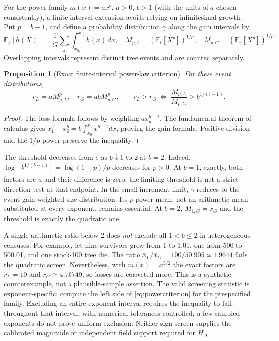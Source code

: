 \documentclass[11pt,a4paper]{article}
\newcommand{\E}{\mathbb{E}}
\newtheorem{proposition}{Proposition}[section]
\theoremstyle{remark}
\begin{document}
For the power family $m(x)=a x^b$, $a>0$, $b>1$ (with the units of $a$ chosen consistently), a finite-interval extension avoids relying on infinitesimal growth. Put $p=b-1$, and define a probability distribution $\gamma$ along the gain intervals by
\begin{equation}
 \E_\gamma[h(X)]=\frac{1}{G}\sum_j\int_{x_{0j}}^{x_{1j}}h(x)\,dx,
 \quad M_{p,L}=(\E_\ell[X^p])^{1/p},\quad M_{p,G}=(\E_\gamma[X^p])^{1/p}.
 \label{eq:powermoments}
\end{equation}
Overlapping intervals represent distinct tree events and are counted separately.
\begin{proposition}[Exact finite-interval power-law criterion]\label{prop:power}
For these event distributions,
\begin{equation}
 r_L=aM_{p,L}^{p},\quad r_G=abM_{p,G}^{p},\qquad
 r_L>r_G\ \Longleftrightarrow\ \frac{M_{p,L}}{M_{p,G}}>b^{1/(b-1)}.
 \label{eq:powercriterion}
\end{equation}
\end{proposition}
\begin{proof}
The loss formula follows by weighting $a x_d^{b-1}$. The fundamental theorem of calculus gives $x_1^b-x_0^b=b\int_{x_0}^{x_1}x^{b-1}dx$, proving the gain formula. Positive division and the $1/p$ power preserve the inequality.
\end{proof}

The threshold decreases from $e$ as $b\downarrow1$ to 2 at $b=2$. Indeed, $\log[b^{1/(b-1)}]=\log(1+p)/p$ decreases for $p>0$. At $b=1$, exactly, both factors are $a$ and their difference is zero; the limiting threshold is not a strict-direction test at that endpoint. In the small-increment limit, $\gamma$ reduces to the event-gain-weighted size distribution. Its $p$-power mean, not an arithmetic mean substituted at every exponent, remains essential. At $b=2$, $M_{1,G}=\bar x_G$ and the threshold is exactly the quadratic one.

A single arithmetic ratio below 2 does \emph{not} exclude all $1<b\leq2$ in heterogeneous censuses. For example, let nine survivors grow from 1 to 1.01, one from 500 to 500.01, and one stock-100 tree die. The ratio $\bar x_L/\bar x_G=100/50.905\simeq1.9644$ fails the quadratic screen. Nevertheless, with $m(x)=x^{3/2}$ the exact factors are $r_L=10$ and $r_G\simeq4.70749$, so losses are corrected more. This is a synthetic counterexample, not a plausible-sample assertion. The valid screening statistic is exponent-specific: compute the left side of \eqref{eq:powercriterion} for the prespecified family. Excluding an entire exponent interval requires the inequality to fail throughout that interval, with numerical tolerances controlled; a few sampled exponents do not prove uniform exclusion. Neither sign screen supplies the calibrated magnitude or independent field support required for $H_\Delta$.
\end{document}
